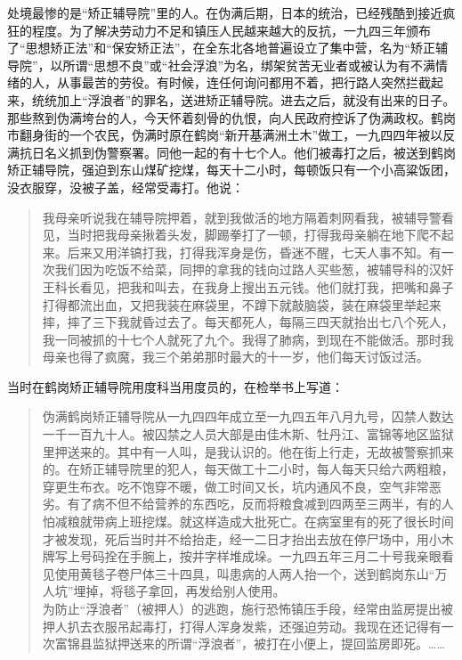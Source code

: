 处境最惨的是“矫正辅导院”里的人。在伪满后期，日本的统治，已经残酷到接近疯狂的程度。为了解决劳动力不足和镇压人民越来越大的反抗，一九四三年颁布了“思想矫正法”和“保安矫正法”，在全东北各地普遍设立了集中营，名为“矫正辅导院”，以所谓“思想不良”或“社会浮浪”为名，绑架贫苦无业者或被认为有不满情绪的人，从事最苦的劳役。有时候，连任何询问都用不着，把行路人突然拦截起来，统统加上“浮浪者”的罪名，送进矫正辅导院。进去之后，就没有出来的日子。那些熬到伪满垮台的人，今天怀着刻骨的仇恨，向人民政府控诉了伪满政权。鹤岗市翻身街的一个农民，伪满时原在鹤岗“新开基满洲土木”做工，一九四四年被以反满抗日名义抓到伪警察署。同他一起的有十七个人。他们被毒打之后，被送到鹤岗矫正辅导院，强迫到东山煤矿挖煤，每天十二小时，每顿饭只有一个小高粱饭团，没衣服穿，没被子盖，经常受毒打。他说：\\

\begin{quote}
	我母亲听说我在辅导院押着，就到我做活的地方隔着刺网看我，被辅导警看见，当时把我母亲揪着头发，脚踢拳打了一顿，打得我母亲躺在地下爬不起来。后来又用洋镐打我，打得我浑身是伤，昏迷不醒，七天人事不知。有一次我们因为吃饭不给菜，同押的拿我的钱向过路人买些葱，被辅导科的汉奸王科长看见，把我和叫去，在我身上搜出五元钱。他们就打我，把嘴和鼻子打得都流出血，又把我装在麻袋里，不蹲下就敲脑袋，装在麻袋里举起来摔，摔了三下我就昏过去了。每天都死人，每隔三四天就抬出七八个死人，我一同被抓的十七个人就死了九个。我得了肺病，到现在不能做活。那时我母亲也得了疯魔，我三个弟弟那时最大的十一岁，他们每天讨饭过活。\\
\end{quote}

当时在鹤岗矫正辅导院用度科当用度员的，在检举书上写道：\\

\begin{quote}
	伪满鹤岗矫正辅导院从一九四四年成立至一九四五年八月九号，囚禁人数达一千一百九十人。被囚禁之人员大部是由佳木斯、牡丹江、富锦等地区监狱里押送来的。其中有一人叫，是我认识的。他在街上行走，无故被警察抓来的。在矫正辅导院里的犯人，每天做工十二小时，每人每天只给六两粗粮，穿更生布衣。吃不饱穿不暖，做工时间又长，坑内通风不良，空气非常恶劣。有了病不但不给营养的东西吃，反而将粮食减到四两至三两半，有的人怕减粮就带病上班挖煤。就这样造成大批死亡。在病室里有的死了很长时间才被发现，死后当时并不给抬走，经一二日才抬出去放在停尸场中，用小木牌写上号码拴在手腕上，按井字样堆成垛。一九四五年三月二十号我亲眼看见使用黄毯子卷尸体三十四具，叫患病的人两人抬一个，送到鹤岗东山“万人坑”埋掉，将毯子拿回，再发给别人使用。\\

为防止“浮浪者”（被押人）的逃跑，施行恐怖镇压手段，经常由监房提出被押人扒去衣服吊起毒打，打得人浑身发紫，还强迫劳动。我现在还记得有一次富锦县监狱押送来的所谓“浮浪者”，被打在小便上，提回监房即死。……\\
\end{quote}

